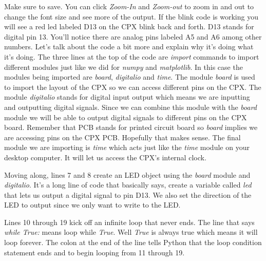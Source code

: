 Make sure to save. You can click {\it Zoom-In} and {\it Zoom-out} to zoom in and
out to change the font size and see more of the output. If the blink
code is working you will see a red led labeled D13 on the CPX blink
back and forth. D13 stands for digital pin 13. You’ll notice there are
analog pins labeled A5 and A6 among other numbers. Let’s talk about
the code a bit more and explain why it’s doing what it’s doing. The
three lines at the top of the code are {\it import} commands to import
different modules just like we did for {\it numpy} and {\it matplotlib}. In this
case the modules being imported are {\it board}, {\it digitalio} and
{\it time}. The module {\it board} is used to import the layout of the
CPX so we can access different pins on the CPX. The module {\it digitalio}
stands for digital input output which means we are inputting and
outputting digital signals. Since we can combine this module with the
{\it board} module we will be able to output digital signals to
different pins on the CPX board. Remember that PCB stands for printed
circuit board so {\it board} implies we are accessing pins on the CPX
PCB. Hopefully that makes sense. The final module we are importing is
{\it time} which acts just like the {\it time} module on your desktop
computer. It will let us access the CPX’s internal clock.

Moving along, lines 7 and 8 create an LED object using the {\it board}
module and {\it digitalio}. It’s a long line of code that basically says,
create a variable called {\it led} that lets us output a digital signal to
pin D13. We also set the direction of the LED to output since we only
want to write to the LED.

Lines 10 through 19 kick off an infinite loop that never ends. The
line that says {\it while True:} means loop while {\it True}. Well
{\it True} is always true which means it will loop forever. The colon
at the end of the line tells Python that the loop condition statement
ends and to begin looping from 11 through 19.

